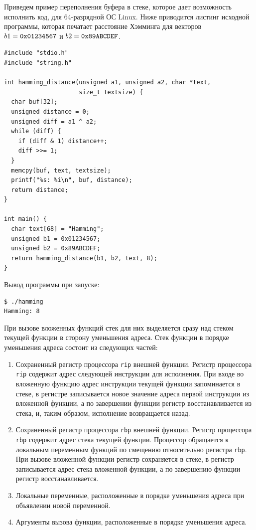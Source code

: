 Приведем пример переполнения буфера в стеке, которое дает возможность исполнить код, для 64-разрядной ОС Linux. Ниже приводится листинг исходной программы, которая печатает расстояние Хэмминга для векторов $b1 = \text{\texttt{0x01234567}}$ и $b2 = \text{\texttt{0x89ABCDEF}}$.

\begin{verbatim}
#include "stdio.h"
#include "string.h"

int hamming_distance(unsigned a1, unsigned a2, char *text,
                     size_t textsize) {
  char buf[32];
  unsigned distance = 0;
  unsigned diff = a1 ^ a2;
  while (diff) {
    if (diff & 1) distance++;
    diff >>= 1;
  }
  memcpy(buf, text, textsize);
  printf("%s: %i\n", buf, distance);
  return distance;
}

int main() {
  char text[68] = "Hamming";
  unsigned b1 = 0x01234567;
  unsigned b2 = 0x89ABCDEF;
  return hamming_distance(b1, b2, text, 8);
}
\end{verbatim}

Вывод программы при запуске:
\begin{verbatim}
$ ./hamming
Hamming: 8
\end{verbatim}

При вызове вложенных функций стек для них выделяется сразу над стеком текущей функции в сторону уменьшения адреса. Стек функции в порядке уменьшения адреса состоит из следующих частей:
\begin{enumerate}
    \item Сохраненный регистр процессора \texttt{rip} внешней функции. Регистр процессора \texttt{rip} содержит адрес следующей инструкции для исполнения. При входе во вложенную функцию адрес инструкции текущей функции запоминается в стеке, в регистре записывается новое значение адреса первой инструкции из вложенной функции, а по завершении функции регистр восстанавливается из стека, и, таким образом, исполнение возвращается назад.
    \item Сохраненный регистр процессора \texttt{rbp} внешней функции. Регистр процессора \texttt{rbp} содержит адрес стека текущей функции. Процессор обращается к локальным переменным функций по смещению относительно регистра \texttt{rbp}. При вызове вложенной функции регистр сохраняется в стеке, в регистр записывается адрес стека вложенной функции, а по завершению функции регистр восстанавливается.
    \item Локальные переменные, расположенные в порядке уменьшения адреса при объявлении новой переменной.
    \item Аргументы вызова функции, расположенные в порядке уменьшения адреса.
\end{enumerate}

